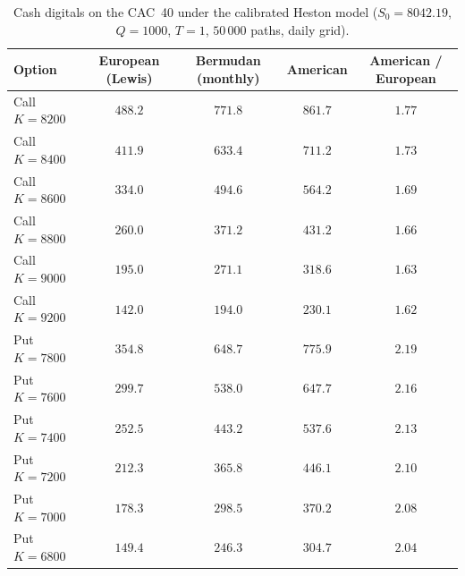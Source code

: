 \documentclass[11pt,a4paper]{article}
\theoremstyle{remark}
\begin{document}
\begin{table}[htbp]
\centering
\small
\begin{tabular}{lcccc}
\toprule
Option & European (Lewis) & Bermudan (monthly) & American & American / European \\
\midrule
Call $K=8200$ & $488.2$ & $771.8$ & $861.7$ & $1.77$ \\
Call $K=8400$ & $411.9$ & $633.4$ & $711.2$ & $1.73$ \\
Call $K=8600$ & $334.0$ & $494.6$ & $564.2$ & $1.69$ \\
Call $K=8800$ & $260.0$ & $371.2$ & $431.2$ & $1.66$ \\
Call $K=9000$ & $195.0$ & $271.1$ & $318.6$ & $1.63$ \\
Call $K=9200$ & $142.0$ & $194.0$ & $230.1$ & $1.62$ \\
\midrule
Put $K=7800$  & $354.8$ & $648.7$ & $775.9$ & $2.19$ \\
Put $K=7600$  & $299.7$ & $538.0$ & $647.7$ & $2.16$ \\
Put $K=7400$  & $252.5$ & $443.2$ & $537.6$ & $2.13$ \\
Put $K=7200$  & $212.3$ & $365.8$ & $446.1$ & $2.10$ \\
Put $K=7000$  & $178.3$ & $298.5$ & $370.2$ & $2.08$ \\
Put $K=6800$  & $149.4$ & $246.3$ & $304.7$ & $2.04$ \\
\bottomrule
\end{tabular}
\caption{Cash digitals on the CAC~40 under the calibrated Heston model
($S_0 = 8042.19$, $Q = 1000$, $T = 1$, $50\,000$ paths, daily grid).}
\label{tab:american-heston}
\end{table}
\end{document}
